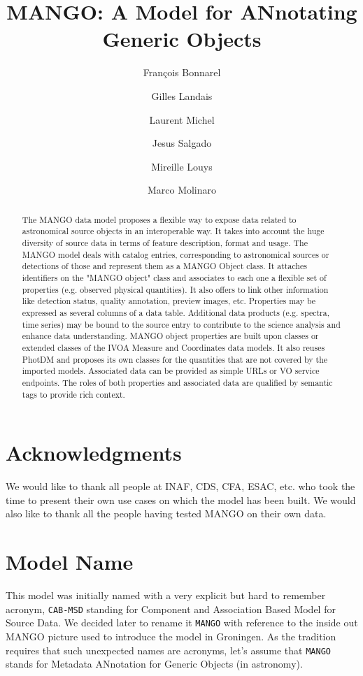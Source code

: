 \documentclass[11pt,a4paper]{ivoa}
\title{MANGO: A Model for ANnotating Generic Objects}
\author{François Bonnarel}
\author{Gilles Landais}
\author{Laurent Michel}
\author{Jesus Salgado}
\author{Mireille Louys}
\author{Marco Molinaro}
\begin{document}
\begin{abstract}

The MANGO data model proposes a flexible way to expose data related to astronomical source objects 
in an interoperable way.
It takes into account the huge diversity of source data in terms of feature description, format and usage.
The MANGO model deals with catalog entries, corresponding to astronomical sources or detections of those and represent them as a MANGO Object class.  
It attaches identifiers on the "MANGO object" class and associates to each one a flexible 
set of properties (e.g. observed physical quantities). It also offers to link other information like detection status, quality annotation, preview images, etc.
Properties may be expressed as several columns of a data table.
Additional data products (e.g. spectra, time series) may be bound to the source entry to contribute to the science analysis and enhance data understanding.
MANGO object properties are built upon classes or extended classes of the IVOA Measure
and Coordinates data models. It also reuses PhotDM and proposes its own classes for the quantities 
that are not covered by the imported models.
Associated data can be provided as simple URLs or VO service endpoints.
The roles of both properties and associated data are qualified by semantic tags to provide rich context. 

\end{abstract}


\section*{Acknowledgments}

We would like to thank all people at INAF, CDS, CFA, ESAC, etc.  who took the time to present their own use cases on which the model has been built.
We would also like to thank all the people having tested MANGO on their own data.

\section*{Model Name}
This model was initially named with a very explicit but hard to remember acronym, \texttt{CAB-MSD}
standing for Component and Association Based Model for Source Data.
We decided later to rename it \texttt{MANGO} with reference to the inside out MANGO
picture used to introduce the model in Groningen. 
As the tradition requires that such unexpected names are acronyms,
let's assume that \texttt{MANGO} stands for
Metadata ANnotation for Generic Objects (in astronomy).
\end{document}
